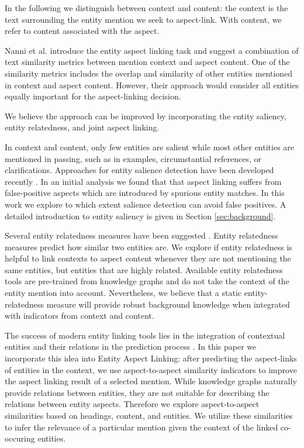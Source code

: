 \bigskip
{}


In the following we distinguish between context and content: the context is the text surrounding the entity mention we seek to aspect-link. With content, we refer to content associated with the aspect.

Nanni et al. \cite{nanni2018entity} introduce the entity aspect linking task and suggest a combination of text similarity metrics between mention context and aspect content. One of the similarity metrics includes the overlap and similarity of other entities mentioned in context and aspect content. However, their approach would consider all entities equally important for the aspect-linking decision.

We believe the approach can be improved by incorporating the entity saliency, entity relatedness, and joint aspect linking.  

In context and content, only few entities are salient while most other entities are mentioned in passing, such as in examples, circumstantial references, or clarifications. Approaches for entity salience detection have been developed  recently .   In an initial analysis we found that that aspect linking suffers from false-positive aspects which are introduced by spurious entity matches. In this work we explore to which extent salience detection can avoid false positives.
A detailed introduction to entity saliency is given in Section \ref{sec:background}.


Several entity relatedness measures have been suggested \cite{ristoski2016rdf2vec} . Entity relatedness measures predict how similar two entities are. We explore if entity relatedness is helpful to link contexts to aspect content whenever they are not mentioning the same entities, but entities that are highly related.
Available entity relatedness tools are pre-trained from knowledge graphs and do not take the context of the entity mention into account. Nevertheless, we believe that a static entity-relatedness measure will provide robust background knowledge when integrated with indicators from context and content.

The success of modern entity linking tools lies in the integration of contextual entities and their relations in the prediction process . In this paper we incorporate this idea into Entity Aspect Linking: after predicting the aspect-links of entities in the context, we use aspect-to-aspect similarity indicators to improve the aspect linking result of a selected mention. While knowledge graphs naturally provide relations between entities, they are not suitable for describing the relations between entity aspects. Therefore we explore aspect-to-aspect similarities based on headings, content, and entities. We utilize these similarities to infer the relevance of a particular mention given the context of the linked co-occuring entities.
 
